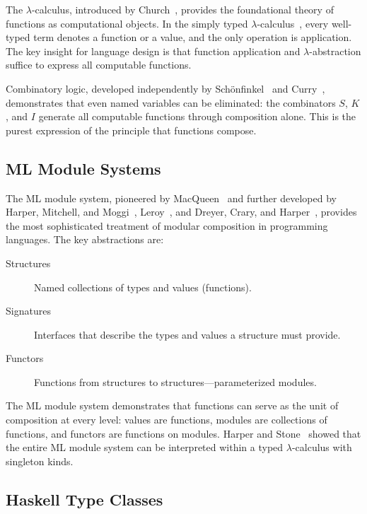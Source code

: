 \documentclass[11pt,a4paper]{article}
\begin{document}
The $\lambda$-calculus, introduced by Church~\citep{church1936unsolvable}, provides the foundational theory of functions as computational objects. In the simply typed $\lambda$-calculus~\citep{church1940formulated}, every well-typed term denotes a function or a value, and the only operation is application. The key insight for language design is that function application and $\lambda$-abstraction suffice to express all computable functions.

Combinatory logic, developed independently by Sch\"{o}nfinkel~\citep{schonfinkel1924bausteine} and Curry~\citep{curry1958combinatory}, demonstrates that even named variables can be eliminated: the combinators $S$, $K$, and $I$ generate all computable functions through composition alone. This is the purest expression of the principle that functions compose.

\subsection{ML Module Systems}

The ML module system, pioneered by MacQueen~\citep{macqueen1984modules} and further developed by Harper, Mitchell, and Moggi~\citep{harper1990type}, Leroy~\citep{leroy1994manifest,leroy1995applicative}, and Dreyer, Crary, and Harper~\citep{dreyer2003type}, provides the most sophisticated treatment of modular composition in programming languages. The key abstractions are:

\begin{description}
  \item[Structures] Named collections of types and values (functions).
  \item[Signatures] Interfaces that describe the types and values a structure must provide.
  \item[Functors] Functions from structures to structures---parameterized modules.
\end{description}

The ML module system demonstrates that functions can serve as the unit of composition at every level: values are functions, modules are collections of functions, and functors are functions on modules. Harper and Stone~\citep{harper2000interpretation} showed that the entire ML module system can be interpreted within a typed $\lambda$-calculus with singleton kinds.

\subsection{Haskell Type Classes}
\end{document}
